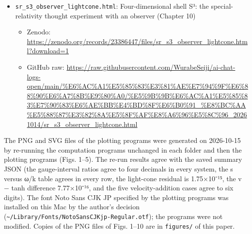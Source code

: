\documentclass[
  a4paper,
]{article}
\providecommand{\tightlist}{%
  \setlength{\itemsep}{0pt}\setlength{\parskip}{0pt}}
\begin{document}
\begin{itemize}
  \begin{itemize}
  \tightlist
  \item
    Zenodo:
    \url{https://zenodo.org/records/23386447/files/s3_phase_rotation_action_lightcone.html?download=1}
  \item
    GitHub raw:
    \url{https://raw.githubusercontent.com/WurabeSeiji/ai-chat-logs-open/main/\%E6\%AC\%A1\%E5\%85\%83\%E3\%81\%AE\%E7\%94\%9F\%E6\%88\%90\%E6\%A7\%8B\%E9\%80\%A0/\%E5\%9B\%9B\%E6\%AC\%A1\%E5\%85\%83\%E7\%90\%83\%E6\%AE\%BB\%E4\%BD\%8F\%E6\%B0\%91_\%E8\%BC\%AA\%E5\%88\%87\%E3\%82\%8A\%E5\%8F\%AF\%E8\%A6\%96\%E5\%8C\%96_20261014/s3_phase_rotation_action_lightcone.html}
  \end{itemize}
\item
  \texttt{sr\_\allowbreak{}s3\_\allowbreak{}observer\_\allowbreak{}lightcone.html}: Four-dimensional shell S³:
  the special-relativity thought experiment with an observer (Chapter
  10)

  \begin{itemize}
  \tightlist
  \item
    Zenodo:
    \url{https://zenodo.org/records/23386447/files/sr_s3_observer_lightcone.html?download=1}
  \item
    GitHub raw:
    \url{https://raw.githubusercontent.com/WurabeSeiji/ai-chat-logs-open/main/\%E6\%AC\%A1\%E5\%85\%83\%E3\%81\%AE\%E7\%94\%9F\%E6\%88\%90\%E6\%A7\%8B\%E9\%80\%A0/\%E5\%9B\%9B\%E6\%AC\%A1\%E5\%85\%83\%E7\%90\%83\%E6\%AE\%BB\%E4\%BD\%8F\%E6\%B0\%91_\%E8\%BC\%AA\%E5\%88\%87\%E3\%82\%8A\%E5\%8F\%AF\%E8\%A6\%96\%E5\%8C\%96_20261014/sr_s3_observer_lightcone.html}
  \end{itemize}
\end{itemize}

The PNG and SVG files of the plotting programs were generated on
2026-10-15 by re-running the computation programs unchanged in each
folder and then the plotting programs (Figs. 1--5). The re-run results
agree with the saved summary JSON (the gauge-interval ratios agree to
four decimals in every system, the s versus ω/k table agrees in every
row, the light-cone residual is 1.75×10⁻¹⁵, the v − tanh difference
7.77×10⁻¹⁶, and the five velocity-addition cases agree to six digits).
The font Noto Sans CJK JP specified by the plotting programs was
installed on this Mac by the author's decision
(\texttt{\textasciitilde{}/Library/Fonts/NotoSansCJKjp-Regular.otf});
the programs were not modified. Copies of the PNG files of Figs. 1--10
are in \texttt{figures/\allowbreak{}} of this paper.
\end{document}
